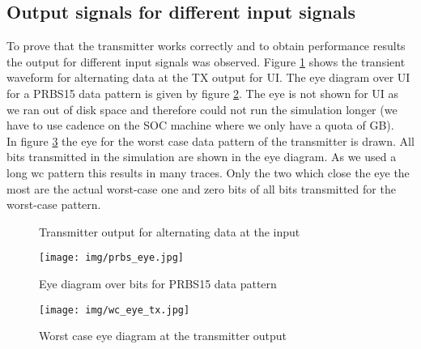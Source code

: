 \subsection{Output signals for different input signals}

To prove that the transmitter works correctly and to obtain performance results the output for different input signals was observed. Figure \ref{fig:alternating_data} shows the transient waveform for alternating data at the TX output for \unit[6]{UI}. The eye diagram over \unit[5000]{UI} for a PRBS15 data pattern is given by figure \ref{fig:eye_prbs15}. The eye is not shown for \unit[10000]{UI} as we ran out of disk space and therefore could not run the simulation longer (we have to use cadence on the SOC machine where we only have a quota of \unit[4]{GB}).\\
In figure \ref{fig:wc_eye} the eye for the worst case data pattern of the transmitter is drawn. All bits transmitted in the simulation are shown in the eye diagram. As we used a long wc pattern this results in many traces. Only the two which close the eye the most are the actual worst-case one and zero bits of all bits transmitted for the worst-case pattern.

\begin{figure}[H]
  \centering
  \caption{Transmitter output for alternating data at the input}
  \label{fig:alternating_data}
\end{figure}

\begin{figure}[H]
  \centering
  {\texttt{[image: img/prbs\_eye.jpg]}}
  \caption{Eye diagram over \unit[2940]{bits} for PRBS15 data pattern}
  \label{fig:eye_prbs15}
\end{figure}

\begin{figure}[H]
  \centering
  {\texttt{[image: img/wc\_eye\_tx.jpg]}}
  \caption{Worst case eye diagram at the transmitter output}
  \label{fig:wc_eye}
\end{figure}
